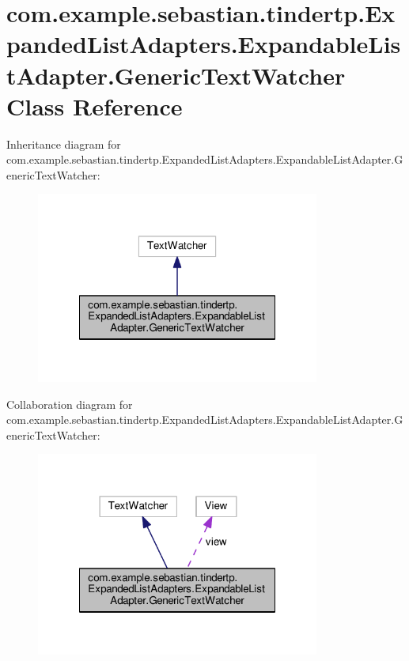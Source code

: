 \hypertarget{classcom_1_1example_1_1sebastian_1_1tindertp_1_1ExpandedListAdapters_1_1ExpandableListAdapter_1_1GenericTextWatcher}{}\section{com.\+example.\+sebastian.\+tindertp.\+Expanded\+List\+Adapters.\+Expandable\+List\+Adapter.\+Generic\+Text\+Watcher Class Reference}
\label{classcom_1_1example_1_1sebastian_1_1tindertp_1_1ExpandedListAdapters_1_1ExpandableListAdapter_1_1GenericTextWatcher}


Inheritance diagram for com.\+example.\+sebastian.\+tindertp.\+Expanded\+List\+Adapters.\+Expandable\+List\+Adapter.\+Generic\+Text\+Watcher\+:\nopagebreak
\begin{figure}[H]
\begin{center}
\leavevmode
\includegraphics[width=264pt]{classcom_1_1example_1_1sebastian_1_1tindertp_1_1ExpandedListAdapters_1_1ExpandableListAdapter_1_dabde94790e27808f1220b6d1f1ba82b}
\end{center}
\end{figure}


Collaboration diagram for com.\+example.\+sebastian.\+tindertp.\+Expanded\+List\+Adapters.\+Expandable\+List\+Adapter.\+Generic\+Text\+Watcher\+:\nopagebreak
\begin{figure}[H]
\begin{center}
\leavevmode
\includegraphics[width=264pt]{classcom_1_1example_1_1sebastian_1_1tindertp_1_1ExpandedListAdapters_1_1ExpandableListAdapter_1_fc9d59b03808abf864ac210bfc314697}
\end{center}
\end{figure}
